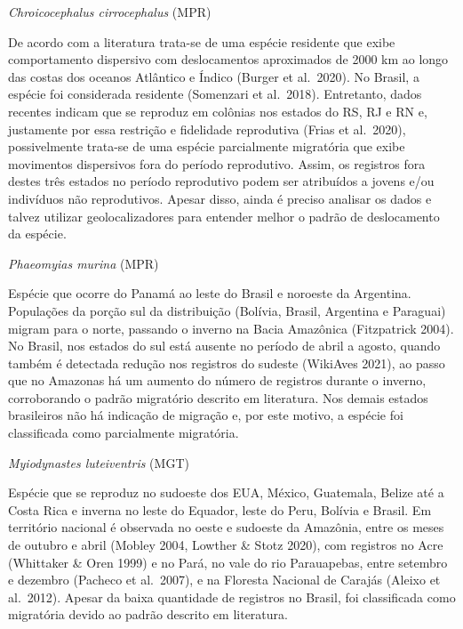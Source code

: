 \documentclass[
  oneside]{scrbook}
\begin{document}
\begin{blackbox}
\emph{Chroicocephalus cirrocephalus} (MPR)

De acordo com a literatura trata-se de uma espécie residente que exibe comportamento dispersivo com deslocamentos aproximados de 2000 km ao longo das costas dos oceanos Atlântico e Índico (Burger et al.~2020). No Brasil, a espécie foi considerada residente (Somenzari et al.~2018). Entretanto, dados recentes indicam que se reproduz em colônias nos estados do RS, RJ e RN e, justamente por essa restrição e fidelidade reprodutiva (Frias et al.~2020), possivelmente trata-se de uma espécie parcialmente migratória que exibe movimentos dispersivos fora do período reprodutivo. Assim, os registros fora destes três estados no período reprodutivo podem ser atribuídos a jovens e/ou indivíduos não reprodutivos. Apesar disso, ainda é preciso analisar os dados e talvez utilizar geolocalizadores para entender melhor o padrão de deslocamento da espécie.

\end{blackbox}

\begin{blackbox}
\emph{Phaeomyias murina} (MPR)

Espécie que ocorre do Panamá ao leste do Brasil e noroeste da Argentina. Populações da porção sul da distribuição (Bolívia, Brasil, Argentina e Paraguai) migram para o norte, passando o inverno na Bacia Amazônica (Fitzpatrick 2004). No Brasil, nos estados do sul está ausente no período de abril a agosto, quando também é detectada redução nos registros do sudeste (WikiAves 2021), ao passo que no Amazonas há um aumento do número de registros durante o inverno, corroborando o padrão migratório descrito em literatura. Nos demais estados brasileiros não há indicação de migração e, por este motivo, a espécie foi classificada como parcialmente migratória.

\end{blackbox}

\begin{blackbox}
\emph{Myiodynastes luteiventris} (MGT)

Espécie que se reproduz no sudoeste dos EUA, México, Guatemala, Belize até a Costa Rica e inverna no leste do Equador, leste do Peru, Bolívia e Brasil. Em território nacional é observada no oeste e sudoeste da Amazônia, entre os meses de outubro e abril (Mobley 2004, Lowther \& Stotz 2020), com registros no Acre (Whittaker \& Oren 1999) e no Pará, no vale do rio Parauapebas, entre setembro e dezembro (Pacheco et al.~2007), e na Floresta Nacional de Carajás (Aleixo et al.~2012). Apesar da baixa quantidade de registros no Brasil, foi classificada como migratória devido ao padrão descrito em literatura.

\end{blackbox}
\end{document}
